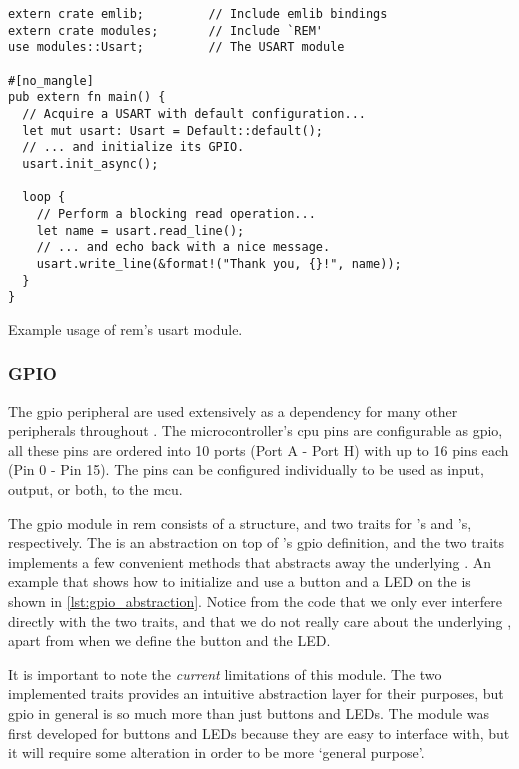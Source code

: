 \begin{listing}[H]
  \begin{verbatim}
extern crate emlib;         // Include emlib bindings
extern crate modules;       // Include `REM'
use modules::Usart;         // The USART module

#[no_mangle]
pub extern fn main() {
  // Acquire a USART with default configuration...
  let mut usart: Usart = Default::default();
  // ... and initialize its GPIO.
  usart.init_async();

  loop {
    // Perform a blocking read operation...
    let name = usart.read_line();
    // ... and echo back with a nice message.
    usart.write_line(&format!("Thank you, {}!", name));
  }
}
  \end{verbatim}
  \caption{Example usage of \gls{rem}'s \gls{usart} module.}
  \label{lst:usart_abstraction}
\end{listing}

\subsubsection{GPIO} %
\label{ssub:gpio}

The \gls{gpio} peripheral are used extensively as a dependency for many other peripherals throughout {\emlib}.
The microcontroller's \gls{cpu} pins are configurable as \gls{gpio}, all these pins are ordered into 10 ports (Port A - Port H) with up to 16 pins each (Pin 0 - Pin 15).
The pins can be configured individually to be used as input, output, or both, to the \gls{mcu}.

The \gls{gpio} module in \gls{rem} consists of a  structure, and two traits for 's and 's, respectively.
The  is an abstraction on top of {\emlib}'s \gls{gpio} definition, and the two traits implements a few convenient methods that abstracts away the underlying .
An example that shows how to initialize and use a button and a LED on the {\STK} is shown in \autoref{lst:gpio_abstraction}.
Notice from the code that we only ever interfere directly with the two traits, and that we do not really care about the underlying , apart from when we define the button and the LED.

It is important to note the \emph{current} limitations of this module.
The two implemented traits provides an intuitive abstraction layer for their purposes, but \gls{gpio} in general is so much more than just buttons and LEDs.
The module was first developed for buttons and LEDs because they are easy to interface with, but it will require some alteration in order to be more `general purpose'.

